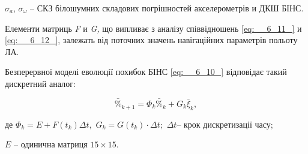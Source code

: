 $\sigma _{a} $, $\sigma _{\omega } $ -- СКЗ білошумних складових погрішностей акселерометрів 
и ДКШ БІНС.

Елементи матриць \textit{F} и \textit{G, } що випливає з аналізу співвідношень \eqref{eq:__6_11_} 
и \eqref{eq:__6_12_}, залежать від поточних значень навігаційних параметрів польоту 
ЛА.

Безперервної моделі еволюції похибок БІНС  \eqref{eq:__6_10_} відповідає такий 
дискретний аналог:

\[\bar{\% }_{k+1} =\Phi _{k} \bar{\% }_{k} +G_{k} \bar{\xi }_{k} ,\] 

де $\Phi _{k} =E+F(t_{k} )\Delta t,$   $G_{k} =G(t_{k} )\cdot \Delta t;$ $\Delta 
t$--  крок дискретизації часу;

$E$ -- одинична матриця  $15\times 15$.





